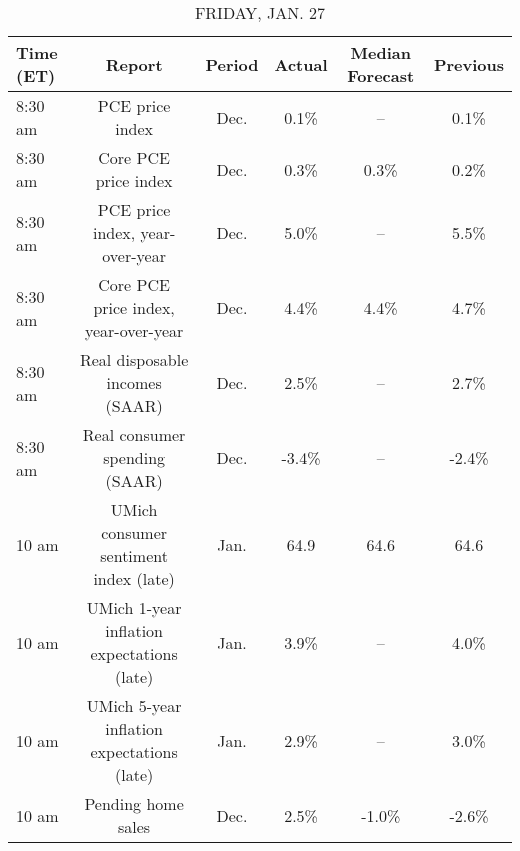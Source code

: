 \documentclass{article}%
\begin{document}
\begin{table}[htbp]%
\caption{FRIDAY, JAN. 27}%
\centering%
\begin{adjustbox}{width=1\textwidth}%
\begin{tabular}{lccccc}
\toprule
Time (ET) &                                     Report & Period & Actual & Median Forecast & Previous \\
\midrule
  8:30 am &                            PCE price index &   Dec. &   0.1\% &              -- &     0.1\% \\
  8:30 am &                       Core PCE price index &   Dec. &   0.3\% &            0.3\% &     0.2\% \\
  8:30 am &            PCE price index, year-over-year &   Dec. &   5.0\% &              -- &     5.5\% \\
  8:30 am &       Core PCE price index, year-over-year &   Dec. &   4.4\% &            4.4\% &     4.7\% \\
  8:30 am &             Real disposable incomes (SAAR) &   Dec. &   2.5\% &              -- &     2.7\% \\
  8:30 am &              Real consumer spending (SAAR) &   Dec. &  -3.4\% &              -- &    -2.4\% \\
    10 am &      UMich consumer sentiment index (late) &   Jan. &   64.9 &            64.6 &     64.6 \\
    10 am & UMich 1-year inflation expectations (late) &   Jan. &   3.9\% &              -- &     4.0\% \\
    10 am & UMich 5-year inflation expectations (late) &   Jan. &   2.9\% &              -- &     3.0\% \\
    10 am &                         Pending home sales &   Dec. &   2.5\% &           -1.0\% &    -2.6\% \\
\bottomrule
\end{tabular}
%
\end{adjustbox}%
\end{table}
\end{document}
